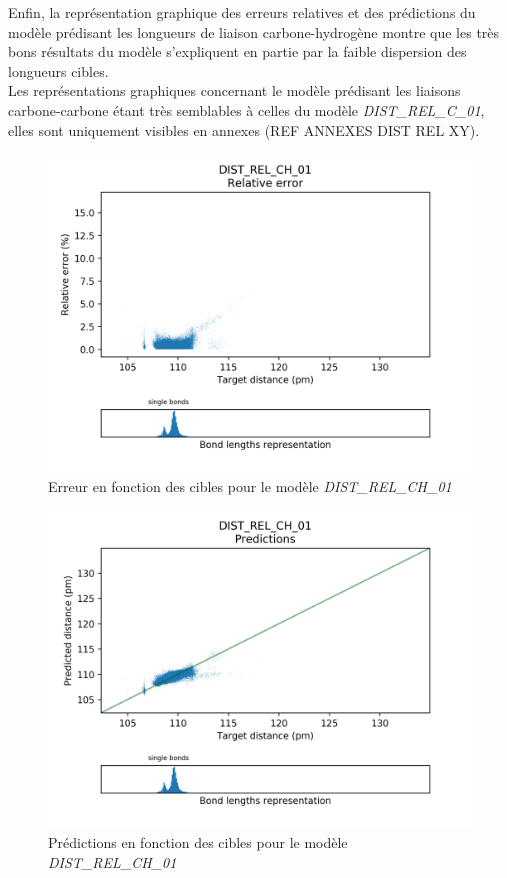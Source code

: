 \par Enfin, la représentation graphique des erreurs relatives et des prédictions du modèle prédisant les longueurs de liaison carbone-hydrogène montre que les très bons résultats du modèle s'expliquent en partie par la faible dispersion des longueurs cibles.\\
Les représentations graphiques concernant le modèle prédisant les liaisons carbone-carbone étant très semblables à celles du modèle \emph{DIST\_REL\_C\_01}, elles sont uniquement visibles en annexes (REF ANNEXES DIST REL XY).

\begin{figure}[!h]
	\centering
	
	\includegraphics[scale=0.7]{../figures/DIST_REL_CH_01/DIST_REL_CH_01_distrib_rmse_dist.png}	
	
	\caption{Erreur en fonction des cibles pour le modèle \emph{DIST\_REL\_CH\_01}}
	\end{figure}
	
\begin{figure}[!h]
	\centering
	
	\includegraphics[scale=0.7]{../figures/DIST_REL_CH_01/DIST_REL_CH_01_preds_targets.png}	
	
	\caption{Prédictions en fonction des cibles pour le modèle \emph{DIST\_REL\_CH\_01}}
	
\end{figure}

